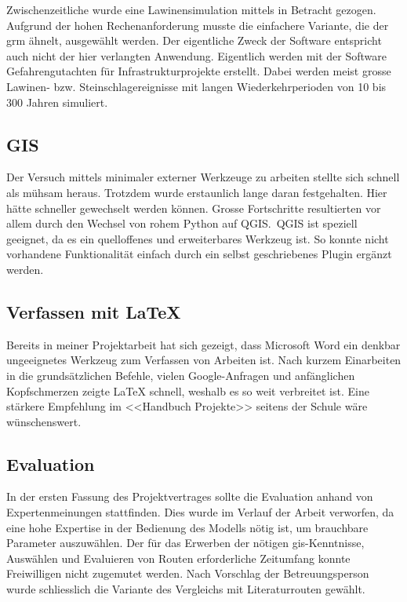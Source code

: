Zwischenzeitliche wurde eine Lawinensimulation mittels  in Betracht gezogen. Aufgrund der hohen Rechenanforderung musste die einfachere Variante, die der \gls{grm} ähnelt, ausgewählt werden. Der eigentliche Zweck der Software entspricht auch nicht der hier verlangten Anwendung. Eigentlich werden mit der Software Gefahrengutachten für Infrastrukturprojekte erstellt. Dabei werden meist grosse Lawinen- bzw. Steinschlagereignisse mit langen Wiederkehrperioden von 10 bis 300 Jahren simuliert.

\subsection{GIS}

Der Versuch mittels minimaler externer Werkzeuge zu arbeiten stellte sich schnell als mühsam heraus. Trotzdem wurde erstaunlich lange daran festgehalten. Hier hätte schneller gewechselt werden können. 
Grosse Fortschritte resultierten vor allem durch den Wechsel von rohem Python auf QGIS.\ QGIS ist speziell geeignet, da es ein quelloffenes und erweiterbares Werkzeug ist. So konnte nicht vorhandene Funktionalität einfach durch ein selbst geschriebenes Plugin ergänzt werden.
\pagebreak
\subsection{Verfassen mit LaTeX}
Bereits in meiner Projektarbeit hat sich gezeigt, dass Microsoft Word ein denkbar ungeeignetes Werkzeug zum Verfassen von Arbeiten ist. Nach kurzem Einarbeiten in die grundsätzlichen Befehle, vielen Google-Anfragen und anfänglichen Kopfschmerzen zeigte LaTeX schnell, weshalb es so weit verbreitet ist. Eine stärkere Empfehlung im <<Handbuch Projekte>> seitens der Schule wäre wünschenswert.

\subsection{Evaluation}

In der ersten Fassung des Projektvertrages sollte die Evaluation anhand von Expertenmeinungen stattfinden. Dies wurde im  Verlauf der Arbeit verworfen, da eine hohe Expertise in der Bedienung des Modells nötig ist, um brauchbare Parameter auszuwählen. Der für das Erwerben der nötigen \gls{gis}-Kenntnisse, Auswählen und Evaluieren von Routen erforderliche Zeitumfang konnte Freiwilligen nicht zugemutet werden. Nach Vorschlag der Betreuungsperson wurde schliesslich die Variante des Vergleichs mit Literaturrouten gewählt.

